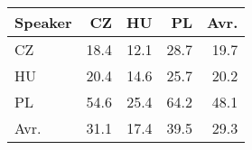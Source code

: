\begin{tabular}{l|rrr|r}
\hline
 Speaker   &   CZ &   HU &   PL &   Avr. \\
\hline
 CZ        & 18.4 & 12.1 & 28.7 &   19.7 \\
 HU        & 20.4 & 14.6 & 25.7 &   20.2 \\
 PL        & 54.6 & 25.4 & 64.2 &   48.1 \\
\hline
 Avr.     & 31.1 & 17.4 & 39.5 &   29.3 \\
\hline
\end{tabular}